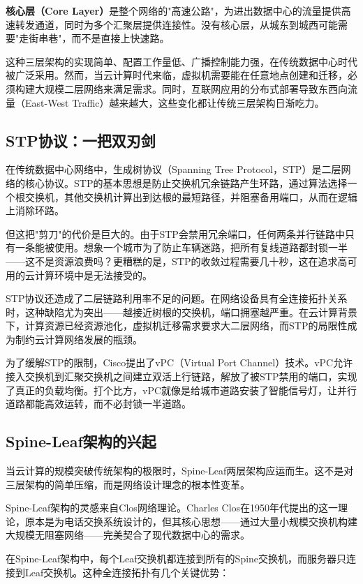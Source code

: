 \textbf{核心层（Core Layer）}是整个网络的"高速公路"，为进出数据中心的流量提供高速转发通道，同时为多个汇聚层提供连接性。没有核心层，从城东到城西可能需要"走街串巷"，而不是直接上快速路。

这种三层架构的实现简单、配置工作量低、广播控制能力强，在传统数据中心时代被广泛采用。然而，当云计算时代来临，虚拟机需要能在任意地点创建和迁移，必须构建大规模二层网络来满足需求。同时，互联网应用的分布式部署导致东西向流量（East-West Traffic）越来越大，这些变化都让传统三层架构日渐吃力。

\subsection{STP协议：一把双刃剑}

在传统数据中心网络中，生成树协议（Spanning Tree Protocol，STP）是二层网络的核心协议。STP的基本思想是防止交换机冗余链路产生环路，通过算法选择一个根交换机，其他交换机计算出到达根的最短路径，并阻塞备用端口，从而在逻辑上消除环路。

但这把"剪刀"的代价是巨大的。由于STP会禁用冗余端口，任何两条并行链路中只有一条能被使用。想象一个城市为了防止车辆迷路，把所有复线道路都封锁一半——这不是资源浪费吗？更糟糕的是，STP的收敛过程需要几十秒，这在追求高可用的云计算环境中是无法接受的。

STP协议还造成了二层链路利用率不足的问题。在网络设备具有全连接拓扑关系时，这种缺陷尤为突出——越接近树根的交换机，端口拥塞越严重。在云计算背景下，计算资源已经资源池化，虚拟机迁移需求要求大二层网络，而STP的局限性成为制约云计算网络发展的瓶颈。

为了缓解STP的限制，Cisco提出了vPC（Virtual Port Channel）技术。vPC允许接入交换机到汇聚交换机之间建立双活上行链路，解放了被STP禁用的端口，实现了真正的负载均衡。打个比方，vPC就像是给城市道路安装了智能信号灯，让并行道路都能高效运转，而不必封锁一半道路。

\subsection{Spine-Leaf架构的兴起}

当云计算的规模突破传统架构的极限时，Spine-Leaf两层架构应运而生。这不是对三层架构的简单压缩，而是网络设计理念的根本性变革。

Spine-Leaf架构的灵感来自Clos网络理论。Charles Clos在1950年代提出的这一理论，原本是为电话交换系统设计的，但其核心思想——通过大量小规模交换机构建大规模无阻塞网络——完美契合了现代数据中心的需求。

在Spine-Leaf架构中，每个Leaf交换机都连接到所有的Spine交换机，而服务器只连接到Leaf交换机。这种全连接拓扑有几个关键优势：

